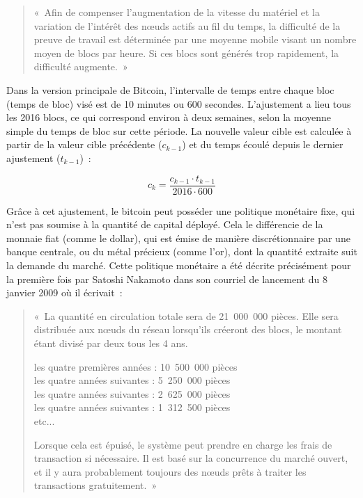 \begin{quote}
«~Afin de compenser l'augmentation de la vitesse du matériel et la variation de l'intérêt des nœuds actifs au fil du temps, la difficulté de la preuve de travail est déterminée par une moyenne mobile visant un nombre moyen de blocs par heure. Si ces blocs sont générés trop rapidement, la difficulté augmente.~»
\end{quote}

Dans la version principale de Bitcoin, l'intervalle de temps entre chaque bloc (temps de bloc) visé est de 10 minutes ou 600 secondes. L'ajustement a lieu tous les 2016 blocs, ce qui correspond environ à deux semaines, selon la moyenne simple du temps de bloc sur cette période. La nouvelle valeur cible est calculée à partir de la valeur cible précédente ($c_{k-1}$) et du temps écoulé depuis le dernier ajustement ($t_{k-1}$)~:

\[
c_{k} = \frac{c_{k-1} \cdot t_{k-1}}{2016 \cdot 600}
\]

Grâce à cet ajustement, le bitcoin peut posséder une politique monétaire fixe, qui n'est pas soumise à la quantité de capital déployé. Cela le différencie de la monnaie fiat (comme le dollar), qui est émise de manière discrétionnaire par une banque centrale, ou du métal précieux (comme l'or), dont la quantité extraite suit la demande du marché. Cette politique monétaire a été décrite précisément pour la première fois par Satoshi Nakamoto dans son courriel de lancement du 8 janvier 2009 où il écrivait~:

\begin{quote}
«~La quantité en circulation totale sera de 21~000~000 pièces. Elle sera distribuée aux nœuds du réseau lorsqu'ils créeront des blocs, le montant étant divisé par deux tous les 4 ans.

les quatre premières années : 10~500~000 pièces\\
les quatre années suivantes : 5~250~000 pièces\\
les quatre années suivantes : 2~625~000 pièces\\
les quatre années suivantes : 1~312~500 pièces\\
etc...

Lorsque cela est épuisé, le système peut prendre en charge les frais de transaction si nécessaire. Il est basé sur la concurrence du marché ouvert, et il y aura probablement toujours des nœuds prêts à traiter les transactions gratuitement.~»
\end{quote}


